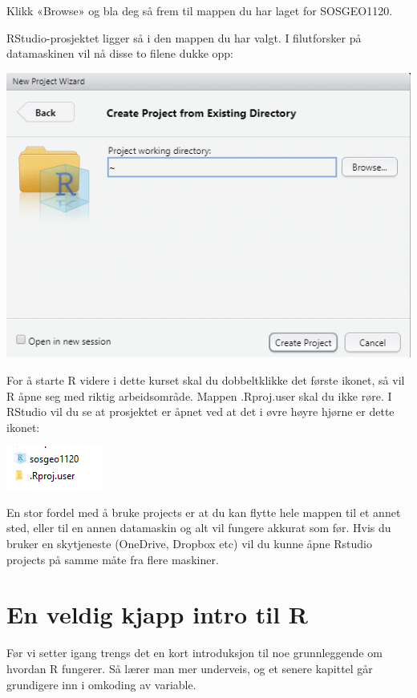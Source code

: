 \documentclass[
  letterpaper,
  DIV=11,
  numbers=noendperiod]{scrreprt}
\theoremstyle{definition}
\theoremstyle{remark}
\begin{document}
Klikk «Browse» og bla deg så frem til mappen du har laget for
SOSGEO1120.

RStudio-prosjektet ligger så i den mappen du har valgt. I filutforsker
på datamaskinen vil nå disse to filene dukke opp:

\includegraphics{./images/proj4.png}

For å starte R videre i dette kurset skal du dobbeltklikke det første
ikonet, så vil R åpne seg med riktig arbeidsområde. Mappen .Rproj.user
skal du ikke røre. I RStudio vil du se at prosjektet er åpnet ved at det
i øvre høyre hjørne er dette ikonet:

\includegraphics{./images/proj5.png}

En stor fordel med å bruke projects er at du kan flytte hele mappen til
et annet sted, eller til en annen datamaskin og alt vil fungere akkurat
som før. Hvis du bruker en skytjeneste (OneDrive, Dropbox etc) vil du
kunne åpne Rstudio projects på samme måte fra flere maskiner.

\hypertarget{en-veldig-kjapp-intro-til-r}{%
\chapter{En veldig kjapp intro til
R}\label{en-veldig-kjapp-intro-til-r}}

Før vi setter igang trengs det en kort introduksjon til noe
grunnleggende om hvordan R fungerer. Så lærer man mer underveis, og et
senere kapittel går grundigere inn i omkoding av variable.
\end{document}
